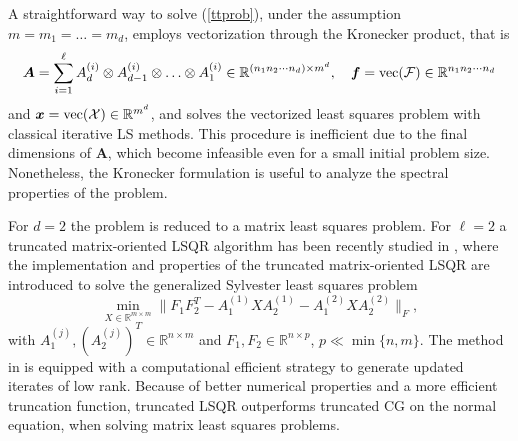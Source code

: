 \documentclass{siamart190516}
\newcommand{\cc}[1]{\mathcal{#1}}
\newcommand{\bb}[1]{\mathbb{#1}}
\begin{document}
A straightforward way to solve (\ref{ttprob}), under the assumption $m = m_1 = \ldots = m_d$, employs vectorization through the Kronecker product, that is 
$$
{\bm A} =\sum_{i=1}^{\ell} A^{(i)}_d \otimes A^{(i)}_{d-1} \otimes \ldots \otimes A^{(i)}_1\in\bb{R}^{(n_1 n_2\cdots n_d) \times m^d}, %
\quad {\bm f}={\rm vec}(\cc{F})\in\bb{R}^{n_1 n_2 \cdots n_d}
$$ 
and ${\bm x}={\rm vec}(\cc{X})\in\bb{R}^{m^d}$,
and solves the vectorized least squares problem with
classical iterative LS methods. This procedure is inefficient due to the final dimensions of ${\bm A}$, which become infeasible even for a small initial problem size. 
Nonetheless, the Kronecker formulation is useful to analyze the spectral properties of the problem.


 



For $d=2$ the problem is reduced to a matrix least squares problem. For $\ell =2$ a truncated matrix-oriented LSQR algorithm has been recently studied in \cite{simoncini:hal-04437719}, where the implementation and properties of the truncated matrix-oriented LSQR are introduced to solve the generalized Sylvester least squares problem
\begin{equation}
    \min_{X\in\bb{R}^{m\times m}} \| F_1F_2^T - A_1^{(1)} X A_2^{(1)} - A_1^{(2)} X A_2^{(2)}\|_F,
\end{equation}
with $A_1^{(j)},(A_2^{(j)})^T\in\bb{R}^{n\times m}$ and $F_1,F_2\in\bb{R}^{n\times p}$, $p\ll \min\{n,m\}$. 
The method in \cite{simoncini:hal-04437719} is equipped with a computational efficient strategy to generate 
updated iterates of low rank. 
 Because of better numerical properties and a more efficient truncation function, truncated LSQR outperforms truncated CG on the normal equation, when solving matrix least squares problems.
\end{document}
